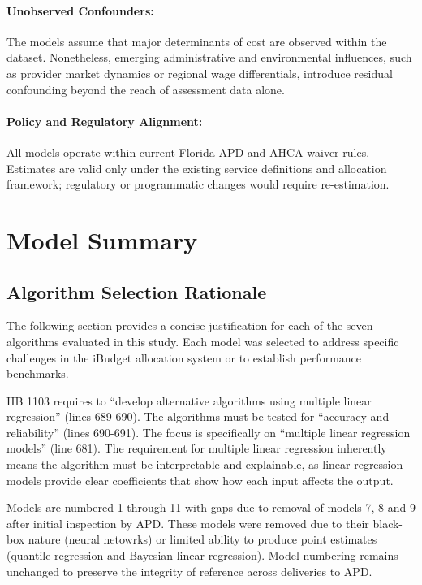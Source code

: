 \paragraph{Unobserved Confounders:} The models assume that major determinants of cost are observed within the dataset.  Nonetheless, emerging administrative and environmental influences, such as provider market dynamics or regional wage differentials, introduce residual confounding beyond the reach of assessment data alone.
 
\paragraph{Policy and Regulatory Alignment:} All models operate within current Florida APD and AHCA waiver rules.  Estimates are valid only under the existing service definitions and allocation framework; regulatory or programmatic changes would require re-estimation.

\section{Model Summary}

\subsection{Algorithm Selection Rationale}

The following section provides a concise justification for each of the seven algorithms evaluated in this study. Each model was selected to address specific challenges in the iBudget allocation system or to establish performance benchmarks.

HB 1103  requires to ``develop alternative algorithms using multiple linear regression'' (lines 689-690). The algorithms must be tested for ``accuracy and reliability'' (lines 690-691). The focus is specifically on ``multiple linear regression models'' (line 681). The requirement for multiple linear regression inherently means the algorithm must be interpretable and explainable, as linear regression models provide clear coefficients that show how each input affects the output.

Models are numbered 1 through 11 with gaps due to removal of models 7, 8 and 9 after initial inspection by APD. These models were removed due to their black-box nature (neural netowrks) or limited ability to produce point estimates (quantile regression and Bayesian linear regression). Model numbering remains unchanged to preserve the integrity of reference across deliveries to APD. 

